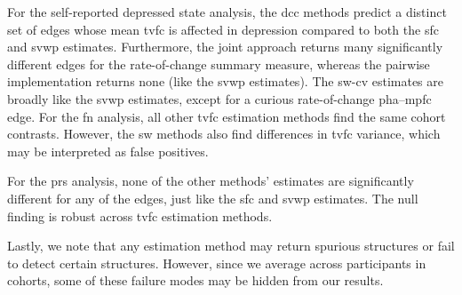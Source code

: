 For the self-reported depressed state analysis, the \gls{dcc} methods predict a distinct set of edges whose mean \gls{tvfc} is affected in depression compared to both the \gls{sfc} and \gls{svwp} estimates.
Furthermore, the joint approach returns many significantly different edges for the rate-of-change summary measure, whereas the pairwise implementation returns none (like the \gls{svwp} estimates).
The \gls{sw-cv} estimates are broadly like the \gls{svwp} estimates, except for a curious rate-of-change \gls{pha}--\gls{mpfc} edge.
%
For the \gls{fn} analysis, all other \gls{tvfc} estimation methods find the same cohort contrasts.
However, the \gls{sw} methods also find differences in \gls{tvfc} variance, which may be interpreted as false positives.

For the \gls{prs} analysis, none of the other methods' estimates are significantly different for any of the edges, just like the \gls{sfc} and \gls{svwp} estimates.
The null finding is robust across \gls{tvfc} estimation methods.

Lastly, we note that any estimation method may return spurious structures or fail to detect certain structures.
However, since we average across participants in cohorts, some of these failure modes may be hidden from our results.
